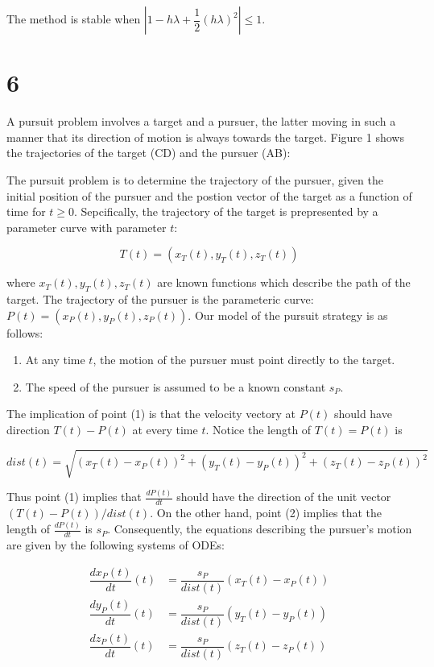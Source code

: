 \documentclass[11pt]{article}
\begin{document}
The method is stable when $|1 - h \lambda + \dfrac{1}{2} (h\lambda)^2| \leq 1$.

\section{6}

A pursuit problem involves a target and a pursuer, the latter moving in such a manner that its direction of motion is always towards the target. Figure 1 shows the trajectories of the target (CD) and the pursuer (AB):

The pursuit problem is to determine the trajectory of the pursuer, given the initial position of the pursuer and the postion vector of the target as a function of time for $t \geq 0$. Sepcifically, the trajectory of the target is prepresented by a parameter curve with parameter $t$:

\[ T(t) = (x_T(t), y_T(t), z_T(t)) \]

where $x_T(t), y_T(t), z_T(t)$ are known functions which describe the path of the target. The trajectory of the pursuer is the parameteric curve: $P(t) = (x_P(t), y_P(t), z_P(t))$. Our model of the pursuit strategy is as follows:

\begin{enumerate}
  \item At any time $t$, the motion of the pursuer must point directly to the target.
  \item The speed of the pursuer is assumed to be a known constant $s_P$.
\end{enumerate}

The implication of point (1) is that the velocity vectory at $P(t)$ should have direction $T(t) - P(t)$ at every time $t$. Notice the length of $T(t) = P(t)$ is

\[ dist(t) = \sqrt{(x_T(t) - x_P(t))^2 + (y_T(t) - y_P(t))^2 + (z_T(t) - z_P(t))^2} \]

Thus point (1) implies that $\frac{dP(t)}{dt}$ should have the direction of the unit vector $(T(t) - P(t)) / dist(t)$. On the other hand, point (2) implies that the length of $\frac{dP(t)}{dt}$ is $s_P$. Consequently, the equations describing the pursuer's motion are given by the following systems of ODEs:

\begin{align*}
  \dfrac{dx_P(t)}{dt} (t) &= \dfrac{s_P}{dist(t)} (x_T(t) - x_P(t)) \\
  \dfrac{dy_P(t)}{dt} (t) &= \dfrac{s_P}{dist(t)} (y_T(t) - y_P(t)) \\
  \dfrac{dz_P(t)}{dt} (t) &= \dfrac{s_P}{dist(t)} (z_T(t) - z_P(t)) \\
\end{align*}
\end{document}
